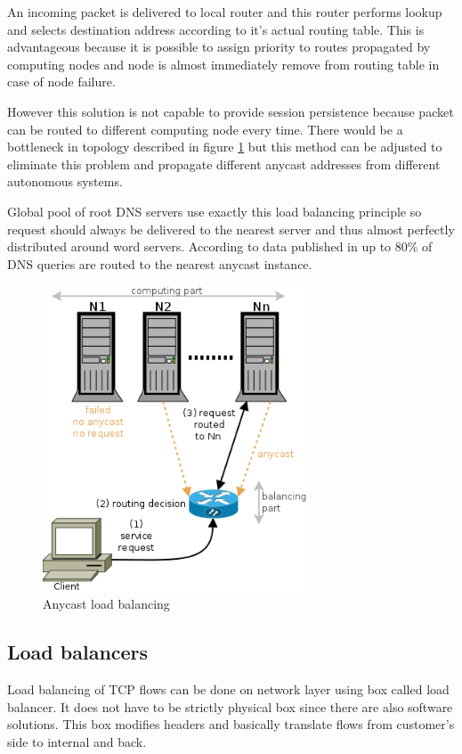 An incoming packet is delivered to local router and this router performs lookup and selects destination address according to it's actual routing table. This is advantageous because it is possible to assign priority to routes propagated by computing nodes and node is almost immediately remove from routing table in case of node failure.

However this solution is not capable to provide session persistence because packet can be routed to different computing node every time. There would be a bottleneck in topology described in figure \ref{img:anycast-balancing} but this method can be adjusted to eliminate this problem and propagate different anycast addresses from different autonomous systems.

Global pool of root \Ac{DNS} servers use exactly this load balancing principle so request should always be delivered to the nearest server and thus almost perfectly distributed around word servers. According to data published in \cite{dns-anycast} up to 80\% of \Ac{DNS} queries are routed to the nearest anycast instance.

\begin{figure}[htb]
	\begin{center}
	\includegraphics[width=0.7\textwidth]{balancing-anycast.png}
	\end{center}
	\caption{Anycast load balancing}
	\label{img:anycast-balancing}
\end{figure}

\subsection{Load balancers}
Load balancing of \Ac{TCP} flows can be done on network layer using box called load balancer. It does not have to be strictly physical box since there are also software solutions. This box modifies headers and basically translate flows from customer's side to internal and back. 

